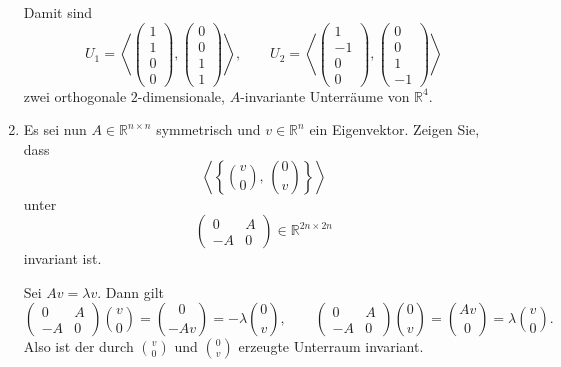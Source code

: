 \documentclass[11pt, a4paper]{article}
\begin{document}
\begin{enumerate}
\begin{framed}
\[  \]
  Damit sind
  \[
    U_1=\left\langle \begin{pmatrix}1\\1\\0\\0\end{pmatrix},
                       \begin{pmatrix}0\\0\\1\\1\end{pmatrix}\right\rangle,
    \qquad
    U_2=\left\langle \begin{pmatrix}1\\-1\\0\\0\end{pmatrix},
                       \begin{pmatrix}0\\0\\1\\-1\end{pmatrix}\right\rangle
  \]
  zwei orthogonale $2$-dimensionale, $A$-invariante Unterräume von $\mathbb{R}^4$.
  \end{framed}

  \item Es sei nun $A\in\mathbb{R}^{n\times n}$ symmetrisch und $v\in\mathbb{R}^n$ ein Eigenvektor. Zeigen Sie, dass
  \[
    \left\langle \left\{ \binom{v}{0},\,\binom{0}{v} \right\} \right\rangle
  \]
  unter
  \[
    \begin{pmatrix}0&A\\ -A&0\end{pmatrix}\in\mathbb{R}^{2n\times 2n}
  \]
  invariant ist.
  \begin{framed}
  Sei $Av=\lambda v$. Dann gilt
  \[
    \begin{pmatrix}0&A\\-A&0\end{pmatrix}\!\binom{v}{0}
      =\binom{0}{-Av}=-\lambda\binom{0}{v},\qquad
    \begin{pmatrix}0&A\\-A&0\end{pmatrix}\!\binom{0}{v}
      =\binom{Av}{0}=\lambda\binom{v}{0}.
  \]
  Also ist der durch $\binom{v}{0}$ und $\binom{0}{v}$ erzeugte Unterraum invariant.
  \end{framed}
\end{enumerate}

\vspace{0.5em}
\end{document}
